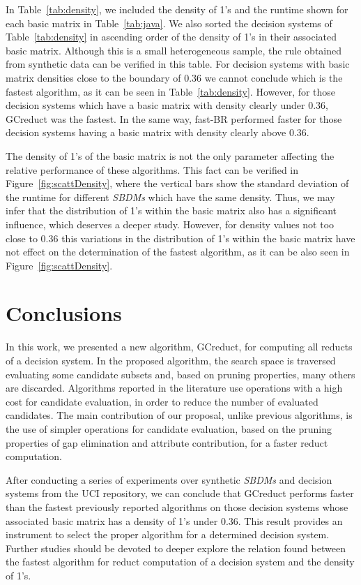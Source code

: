 \documentclass[number,preprint,review,12pt]{elsarticle}
\begin{document}
	\label{par:kind}
	In Table~\ref{tab:density}, we included the density of 1's and the runtime shown for each basic matrix in Table~\ref{tab:java}. We also sorted the decision systems of Table~\ref{tab:density} in ascending order of the density of 1's in their associated basic matrix. Although this is a small heterogeneous sample, the rule obtained from synthetic data can be verified in this table. For decision systems with basic matrix densities close to the boundary of 0.36 we cannot conclude which is the fastest algorithm, as it can be seen in Table~\ref{tab:density}. However, for those decision systems which have a basic matrix with density clearly under 0.36, GCreduct was the fastest. In the same way, fast-BR performed faster for those decision systems having a basic matrix with density clearly above 0.36.
	
	The density of 1's of the basic matrix is not the only parameter affecting the relative performance of these algorithms. This fact can be verified in Figure~\ref{fig:scattDensity}, where the vertical bars show the standard deviation of the runtime for different \textit{SBDMs} which have the same density. Thus, we may infer that the distribution of 1's within the basic matrix also has a significant influence, which deserves a deeper study. However, for density values not too close to 0.36 this variations in the distribution of 1's	within the basic matrix have not effect on the determination of the fastest algorithm, as it can be also seen in Figure~\ref{fig:scattDensity}.\label{par:distribution}

\section{Conclusions}\label{conclusions}
	In this work, we presented a new algorithm, GCreduct, for computing all reducts of a decision system. In the proposed algorithm, the search space is traversed evaluating some candidate subsets and, based on pruning properties, many others are discarded. Algorithms reported in the literature use operations with a high cost for candidate evaluation, in order to reduce the number of evaluated candidates. The main contribution of our proposal, unlike previous algorithms, is the use of simpler operations for candidate evaluation, based on the pruning properties of gap elimination and attribute contribution, for a faster reduct computation. 
	
	After conducting a series of experiments over synthetic \textit{SBDMs} and decision systems from the UCI repository, we can conclude that GCreduct performs faster than the fastest previously reported algorithms on those decision systems whose associated basic matrix has a density of 1's under 0.36. This result provides an instrument to select the proper algorithm for a determined decision system. Further studies should be devoted to deeper explore the relation found between the fastest algorithm for reduct computation of a decision system and the density of 1's. 
	
\end{document}
